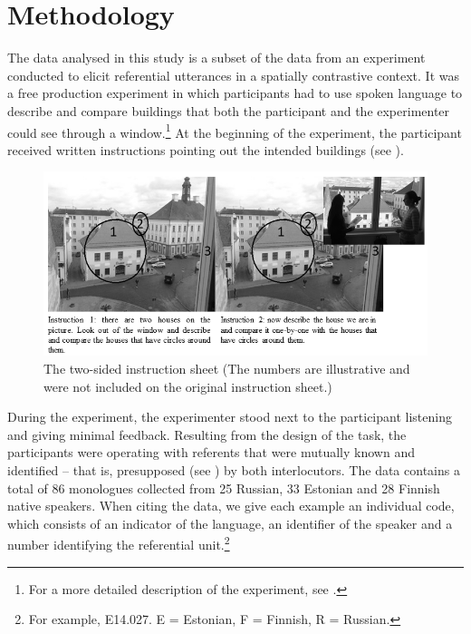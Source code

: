 \documentclass[output=paper,colorlinks,citecolor=brown]{langscibook}
\begin{document}
\section{Methodology}\label{sec:nahkola:2}

The data analysed in this study is a subset of the data from an experiment conducted to elicit referential utterances in a spatially contrastive context. It was a free production experiment in which participants had to use spoken language to describe and compare buildings that both the participant and the experimenter could see through a window.\footnote{For a more detailed description of the experiment, see \citet{ReileEtAl2019}.} At the beginning of the experiment, the participant received written instructions pointing out the intended buildings (see ).

\begin{figure}
\includegraphics[width=\textwidth]{figures/a10Nahkolaetal20200422-img001.png}
\caption{The two-sided instruction sheet (The numbers are illustrative and were not included on the original instruction sheet.)}
\label{fig:nahkola:1}
\end{figure}

During the experiment, the experimenter stood next to the participant listening and giving minimal feedback. Resulting from the design of the task, the participants were operating with referents that were mutually known and identified – that is, presupposed (see \citealt{Silverstein1976}) by both interlocutors. The data contains a total of 86 monologues collected from 25 Russian, 33 Estonian and 28 Finnish native speakers. When citing the data, we give each example an individual code, which consists of an indicator of the language, an identifier of the speaker and a number identifying the referential unit.\footnote{For example, E14.027. E = Estonian, F = Finnish, R = Russian.}
\end{document}
